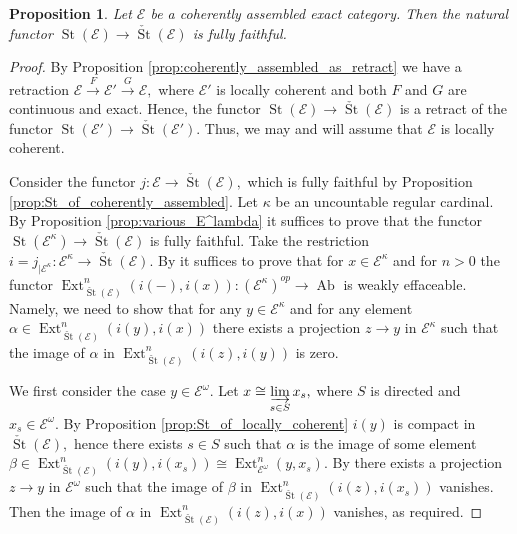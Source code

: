 \documentclass[11pt,leqno]{amsart}
\newtheorem{prop}[theo]{Proposition}
\numberwithin{equation}{section}
\newcommand{\indlim}[1][]{\mathop{\varinjlim}\limits_{#1}}
\newcommand{\xto}{\xrightarrow}
\newcommand{\St}{\operatorname{St}}
\newcommand{\cE}{{\mathcal E}}
\newcommand{\Ab}{\operatorname{Ab}}
\newcommand{\Ext}{\operatorname{Ext}}
\begin{document}
\begin{prop}\label{prop:St_of_E_to_check_St_of_E}
Let $\cE$ be a coherently assembled exact category. Then the natural functor $\St(\cE)\to \check{\St}(\cE)$ is fully faithful.
\end{prop}

\begin{proof}
By Proposition \ref{prop:coherently_assembled_as_retract} we have a retraction $\cE\xto{F}\cE'\xto{G}\cE,$ where $\cE'$ is locally coherent and both $F$ and $G$ are continuous and exact. Hence, the functor $\St(\cE)\to\check{\St}(\cE)$ is a retract of the functor $\St(\cE')\to\check{\St}(\cE').$ Thus, we may and will assume that $\cE$ is locally coherent.

Consider the functor $j:\cE\to\check{\St}(\cE),$ which is fully faithful by Proposition \ref{prop:St_of_coherently_assembled}. Let $\kappa$ be an uncountable regular cardinal. By Proposition \ref{prop:various_E^lambda} it suffices to prove that the functor $\St(\cE^{\kappa})\to\check{\St}(\cE)$ is fully faithful. Take the restriction $i=j_{\mid \cE^{\kappa}}:\cE^{\kappa}\to\check{\St}(\cE).$ By \cite[Lemmas 4.2 and 4.3]{SW26} it suffices to prove that for $x\in\cE^{\kappa}$ and for $n>0$ the functor $\Ext^n_{\check{\St}(\cE)}(i(-),i(x)):(\cE^{\kappa})^{op}\to\Ab$ is weakly effaceable. Namely, we need to show that for any $y\in\cE^{\kappa}$ and for any element $\alpha\in\Ext^n_{\check{\St}(\cE)}(i(y),i(x))$ there exists a projection $z\to y$ in $\cE^{\kappa}$ such that the image of $\alpha$ in $\Ext^n_{\check{\St}(\cE)}(i(z),i(y))$ is zero.

We first consider the case $y\in\cE^{\omega}.$ Let $x\cong \indlim[s\in S]x_s,$ where $S$ is directed and $x_s\in\cE^{\omega}.$ By Proposition \ref{prop:St_of_locally_coherent} $i(y)$ is compact in $\check{\St}(\cE),$ hence there exists $s\in S$ such that $\alpha$ is the image of some element  $\beta\in\Ext^n_{\check{\St}(\cE)}(i(y),i(x_s))\cong \Ext^n_{\cE^{\omega}}(y,x_s).$ By \cite[Lemma 4.3]{SW26} there exists a projection $z\to y$ in $\cE^{\omega}$ such that the image of $\beta$ in $\Ext^n_{\check{\St}(\cE)}(i(z),i(x_s))$ vanishes. Then the image of $\alpha$ in $\Ext^n_{\check{\St}(\cE)}(i(z),i(x))$ vanishes, as required.


\end{proof}
\end{document}

